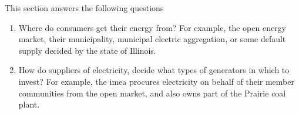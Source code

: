 This section answers the following questions
\begin{enumerate}
    \item Where do consumers get their energy from? For example, the open energy
    market, their municipality, municipal electric aggregation, or some default
    supply decided by the state of Illinois.
    \item How do suppliers of electricity, decide what types of generators in
    which to invest? For example, the \ac{imea} procures electricity on behalf
    of their member communities from the open market, and also owns part of the
    Prairie coal plant.
\end{enumerate}







